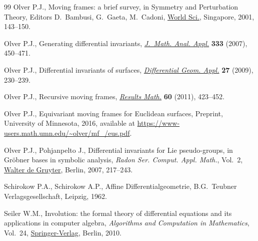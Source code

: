 \begin{thebibliography}{99}
Olver P.J., Moving frames: a brief survey, in Symmetry and Perturbation Theory,
 Editors D.~Bambusi, G.~Gaeta, M.~Cadoni, \href{https://doi.org/10.1142/9789812794543_0020}{World Sci.}, Singapore, 2001,
 143--150.

Olver P.J., Generating differential invariants, \href{https://doi.org/10.1016/j.jmaa.2006.12.029}{\textit{J.~Math. Anal. Appl.}}
 \textbf{333} (2007), 450--471.

Olver P.J., Differential invariants of surfaces, \href{https://doi.org/10.1016/j.difgeo.2008.06.020}{\textit{Differential Geom.
 Appl.}} \textbf{27} (2009), 230--239.

Olver P.J., Recursive moving frames, \href{https://doi.org/10.1007/s00025-011-0153-6}{\textit{Results Math.}} \textbf{60} (2011),
 423--452.

Olver P.J., Equivariant moving frames for Euclidean surfaces, {P}reprint,
 University of Minnesota, 2016, available at
 \url{https://www-users.math.umn.edu/~olver/mf_/eus.pdf}.

Olver P.J., Pohjanpelto J., Differential invariants for {L}ie pseudo-groups, in
 Gr\"obner bases in symbolic analysis, \textit{Radon Ser. Comput. Appl.
 Math.}, Vol.~2, \href{https://doi.org/10.1515/9783110922752}{Walter de Gruyter}, Berlin, 2007, 217--243.

Schirokow P.A., Schirokow A.P., Affine {D}ifferentialgeometrie, B.G.~Teubner
 Verlagsgesellschaft, Leipzig, 1962.

Seiler W.M., Involution: the formal theory of differential equations and its
 applications in computer algebra, \textit{Algorithms and Computation in
 Mathematics}, Vol.~24, \href{https://doi.org/10.1007/978-3-642-01287-7}{Springer-Verlag}, Berlin, 2010.

\end{thebibliography}
